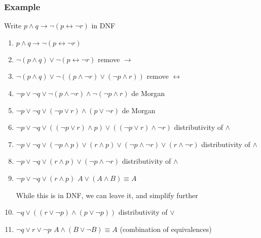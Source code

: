 \documentclass[a4paper, 12pt]{article}
\begin{document}
        \subsubsection*{Example}
        Write $p \land q \rightarrow \neg (p \leftrightarrow \neg r)$ in DNF
        \begin{enumerate}[1.]
            \item $p \land q \rightarrow \neg (p \leftrightarrow \neg r)$
            \item $\neg (p \land q) \lor \neg (p \leftrightarrow \neg r)$ \hfill remove $\rightarrow$
            \item $\neg (p \land q) \lor \neg ((p \land \neg r) \lor (\neg p \land r))$ \hfill remove $\leftrightarrow$
            \item $\neg p \lor \neg q \lor \neg (p \land \neg r) \land \neg (\neg p \land r)$ \hfill de Morgan
            \item $\neg p \lor \neg q \lor (\neg p \lor r) \land (p \lor \neg r)$ \hfill de Morgan
            \item $\neg p \lor \neg q \lor ((\neg p \lor r) \land p) \lor ((\neg p \lor r) \land \neg r)$ \hfill distributivity of $\land$
            \item $\neg p \lor \neg q \lor (\neg p \land p) \lor (r \land p) \lor (\neg p \land \neg r) \lor (r \land \neg r)$ \hfill distributivity of $\land$
            \item $\neg p \lor \neg q \lor (r \land p) \lor (\neg p \land \neg r)$ \hfill distributivity of $\land$
            \item $\neg p \lor \neg q \lor (r \land p)$ \hfill $A \lor (A \land B) \equiv A$
            \medskip

            While this is in DNF, we can leave it, and simplify further
            \item $\neg q \lor ((r \lor \neg p) \land (p \lor \neg p))$ \hfill distributivity of $\lor$
            \item $\neg q \lor r \lor \neg p$ \hfill $A \land (B \lor \neg B) \equiv A$ (combination of equivalences)
        \end{enumerate}
\end{document}
